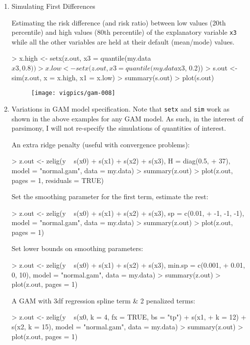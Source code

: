 \begin{enumerate}
\item Simulating First Differences

Estimating the risk difference (and risk ratio) between low values (20th percentile) and high values (80th percentile) of the explanatory variable {\tt x3} while all the other variables are held at their default (mean/mode) values. 

\begin{Schunk}
\begin{Sinput}
> x.high <- setx(z.out, x3 = quantile(my.data$x3, 0.8))
> x.low <- setx(z.out, x3 = quantile(my.data$x3, 0.2))
> s.out <- sim(z.out, x = x.high, x1 = x.low)
> summary(s.out)
> plot(s.out)
\end{Sinput}
\end{Schunk}
\begin{figure}[here]
\centering
\texttt{[image: vigpics/gam-008]}
\label{fig:plotgam}
\end{figure}

\item Variations in GAM model specification. Note that {\tt setx} and {\tt sim} work as shown in the above examples for any GAM model. As such, in the interest of parsimony, I will not re-specify the simulations of quantities of interest. 

An extra ridge penalty (useful with convergence problems):
\begin{Schunk}
\begin{Sinput}
> z.out <- zelig(y ~ s(x0) + s(x1) + s(x2) + s(x3), H = diag(0.5, 
+     37), model = "normal.gam", data = my.data)
> summary(z.out)
> plot(z.out, pages = 1, residuals = TRUE)
\end{Sinput}
\end{Schunk}
Set the smoothing parameter for the first term, estimate the rest:
\begin{Schunk}
\begin{Sinput}
> z.out <- zelig(y ~ s(x0) + s(x1) + s(x2) + s(x3), sp = c(0.01, 
+     -1, -1, -1), model = "normal.gam", data = my.data)
> summary(z.out)
> plot(z.out, pages = 1)
\end{Sinput}
\end{Schunk}
Set lower bounds on smoothing parameters:
\begin{Schunk}
\begin{Sinput}
> z.out <- zelig(y ~ s(x0) + s(x1) + s(x2) + s(x3), min.sp = c(0.001, 
+     0.01, 0, 10), model = "normal.gam", data = my.data)
> summary(z.out)
> plot(z.out, pages = 1)
\end{Sinput}
\end{Schunk}
A GAM with 3df regression spline term \& 2 penalized terms:
\begin{Schunk}
\begin{Sinput}
> z.out <- zelig(y ~ s(x0, k = 4, fx = TRUE, bs = "tp") + s(x1, 
+     k = 12) + s(x2, k = 15), model = "normal.gam", data = my.data)
> summary(z.out)
> plot(z.out, pages = 1)
\end{Sinput}
\end{Schunk}
\end{enumerate}



